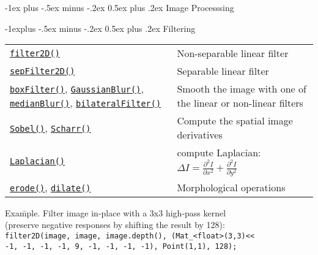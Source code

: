 \documentclass[10pt,landscape]{article}
\makeatletter
\renewcommand{\section}{\@startsection{section}{1}{0mm}%
                                {-1ex plus -.5ex minus -.2ex}%
                                {0.5ex plus .2ex}%
                                {\normalfont\large\bfseries}}
\renewcommand{\subsection}{\@startsection{subsection}{2}{0mm}%
                                {-1explus -.5ex minus -.2ex}%
                                {0.5ex plus .2ex}%
                                {\normalfont\normalsize\bfseries}}
\makeatother
\begin{document}
\begin{multicols}{3}
\section{Image Processsing}

\subsection{Filtering}

\begin{tabular}{@{}p{\the\MyLen}%
                @{}p{\linewidth-\the\MyLen}@{}}
\texttt{\href{http://opencv.itseez.com/modules/imgproc/doc/filtering.html\#filter2d}{filter2D()}} & Non-separable linear filter \\

\texttt{\href{http://opencv.itseez.com/modules/imgproc/doc/filtering.html\#sepfilter2d}{sepFilter2D()}} & Separable linear filter \\

\texttt{\href{http://opencv.itseez.com/modules/imgproc/doc/filtering.html\#blur}{boxFilter()}},  \texttt{\href{http://opencv.itseez.com/modules/imgproc/doc/filtering.html\#gaussianblur}{GaussianBlur()}},
\texttt{\href{http://opencv.itseez.com/modules/imgproc/doc/filtering.html\#medianblur}{medianBlur()}},
\texttt{\href{http://opencv.itseez.com/modules/imgproc/doc/filtering.html\#bilateralfilter}{bilateralFilter()}}
& Smooth the image with one of the linear or non-linear filters \\

\texttt{\href{http://opencv.itseez.com/modules/imgproc/doc/filtering.html\#sobel}{Sobel()}},  \texttt{\href{http://opencv.itseez.com/modules/imgproc/doc/filtering.html\#scharr}{Scharr()}}
& Compute the spatial image derivatives \\
\texttt{\href{http://opencv.itseez.com/modules/imgproc/doc/filtering.html\#laplacian}{Laplacian()}} & compute Laplacian: $\Delta I = \frac{\partial ^ 2 I}{\partial x^2} + \frac{\partial ^ 2 I}{\partial y^2}$  \\

\texttt{\href{http://opencv.itseez.com/modules/imgproc/doc/filtering.html\#erode}{erode()}}, \texttt{\href{http://opencv.itseez.com/modules/imgproc/doc/filtering.html\#dilate}{dilate()}} & Morphological operations \\

\end{tabular}

\begin{tabbing}
Exa\=mple. Filter image in-place with a 3x3 high-pass kernel\\
\> (preserve negative responses by shifting the result by 128):\\
\texttt{filter2D(image, image, image.depth(), (Mat\_<float>(3,3)<<}\\
\> \texttt{-1, -1, -1, -1, 9, -1, -1, -1, -1), Point(1,1), 128);}\\
\end{tabbing}


\end{multicols}
\end{document}
